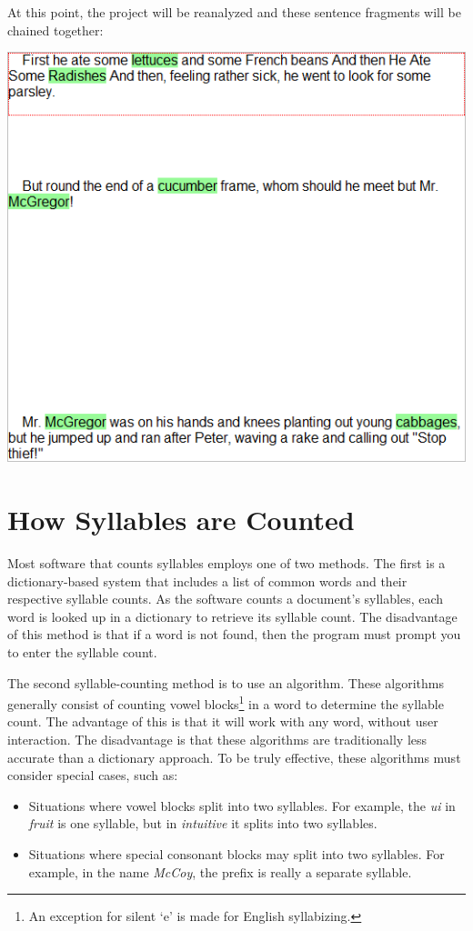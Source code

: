 \documentclass[
]{book}
\providecommand{\tightlist}{%
  \setlength{\itemsep}{0pt}\setlength{\parskip}{0pt}}
\theoremstyle{definition}
\theoremstyle{definition}
\theoremstyle{definition}
\theoremstyle{definition}
\theoremstyle{remark}
\begin{document}
At this point, the project will be reanalyzed and these sentence fragments will be chained together:

\begin{center}\includegraphics[width=0.75\linewidth,]{Images/PeterRabbitChainedSentences} \end{center}

\hypertarget{how-syllables-are-counted}{%
\section{How Syllables are Counted}\label{how-syllables-are-counted}}

Most software that counts syllables employs one of two methods. The first is a dictionary-based system that includes a list of common words and their respective syllable counts. As the software counts a document's syllables, each word is looked up in a dictionary to retrieve its syllable count. The disadvantage of this method is that if a word is not found, then the program must prompt you to enter the syllable count.

The second syllable-counting method is to use an algorithm. These algorithms generally consist of counting vowel blocks\footnote{An exception for silent `e' is made for English syllabizing.} in a word to determine the syllable count. The advantage of this is that it will work with any word, without user interaction. The disadvantage is that these algorithms are traditionally less accurate than a dictionary approach. To be truly effective, these algorithms must consider special cases, such as:

\begin{itemize}
\tightlist
\item
  Situations where vowel blocks split into two syllables. For example, the \emph{ui} in \emph{fruit} is one syllable, but in \emph{intuitive} it splits into two syllables.
\item
  Situations where special consonant blocks may split into two syllables. For example, in the name \emph{McCoy}, the prefix is really a separate syllable.
\end{itemize}
\end{document}
